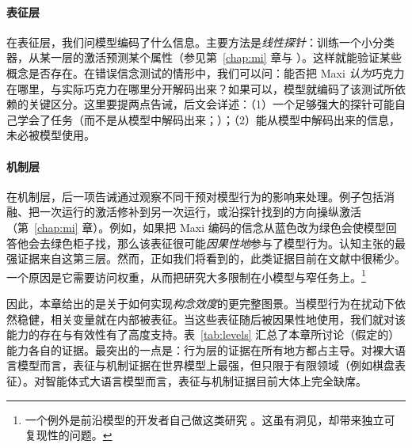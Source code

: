 \paragraph{表征层} 在表征层，我们问模型编码了什么信息。主要方法是{\em 线性探针}：训练一个小分类器，从某一层的激活预测某个属性（参见第~\ref{chap:mi} 章与 \citet{alain2016understanding, belinkov2022probing}）。这样就能验证某些概念是否存在。在错误信念测试的情形中，我们可以问：能否把 Maxi {\em 认为}巧克力在哪里，与实际巧克力在哪里分开解码出来？如果可以，模型就编码了该测试所依赖的关键区分。这里要提两点告诫，后文会详述：（1）一个足够强大的探针可能自己学会了任务（而不是从模型中解码出来；\citep{hewitt2019designing}）；（2）能从模型中解码出来的信息，未必被模型使用。

\paragraph{机制层} 在机制层，后一项告诫通过观察不同干预对模型行为的影响来处理。例子包括消融、把一次运行的激活修补到另一次运行，或沿探针找到的方向操纵激活（第~\ref{chap:mi} 章）。例如，如果把 Maxi 编码的信念从蓝色改为绿色会使模型回答他会去绿色柜子找，那么该表征很可能{\em 因果性地}参与了模型行为。认知主张的最强证据来自这第三层。然而，正如我们将看到的，此类证据目前在文献中很稀少。一个原因是它需要访问权重，从而把研究大多限制在小模型与窄任务上。\footnote{一个例外是前沿模型的开发者自己做这类研究 \citep[如][]{templeton2024scaling, lindsey2025biology}。这虽有洞见，却带来独立可复现性的问题。}

因此，本章给出的是关于如何实现{\em 构念效度}的更完整图景。当模型行为在扰动下依然稳健，相关变量就在内部被表征。当这些表征随后被因果性地使用，我们就对该能力的存在与有效性有了高度支持。表~\ref{tab:levels} 汇总了本章所讨论（假定的）能力各自的证据。最突出的一点是：行为层的证据在所有地方都占主导。对裸大语言模型而言，表征与机制证据在世界模型上最强，但只限于有限领域（例如棋盘表征）。对智能体式大语言模型而言，表征与机制证据目前大体上完全缺席。

